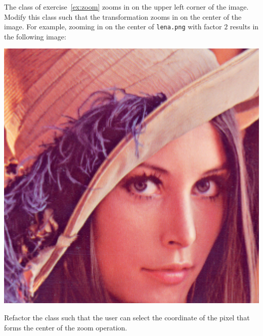 \documentclass{book}
\begin{document}
\begin{exercise}\label{ex:zoom-center}
The class  of exercise~\ref{ex:zoom} zooms in on the upper left corner of the image. Modify this class such that the transformation zooms in on the center of the image. For example, zooming in on the center of \texttt{lena.png} with factor $2$ results in the following image:
\begin{center}
\includegraphics[scale=0.2]{lena-zoom-center-2.png}
\end{center} 
\end{exercise}

\begin{exercise}
Refactor the class  such that the user can select the coordinate of the pixel that forms the center of the zoom operation.
\end{exercise}
\end{document}
